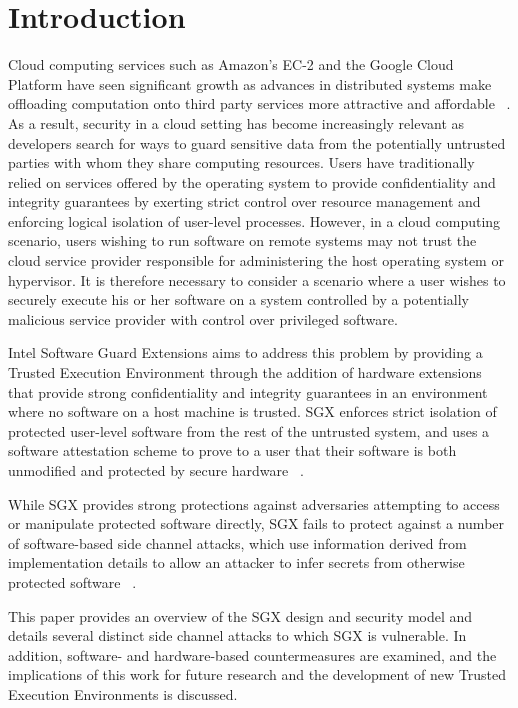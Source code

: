 \section{Introduction}

Cloud computing services such as Amazon's EC-2 and the Google Cloud Platform have seen significant growth as advances in distributed systems make offloading computation onto third party services more attractive and affordable ~\cite{lunden_amazons_2015}. As a result, security in a cloud setting has become increasingly relevant as developers search for ways to guard sensitive data from the potentially untrusted parties with whom they share computing resources. Users have traditionally relied on services offered by the operating system to provide confidentiality and integrity guarantees by exerting strict control over resource management and enforcing logical isolation of user-level processes. However, in a cloud computing scenario, users wishing to run software on remote systems may not trust the cloud service provider responsible for administering the host operating system or hypervisor. It is therefore necessary to consider a scenario where a user wishes to securely execute his or her software on a system controlled by a potentially malicious service provider with control over privileged software. 

Intel Software Guard Extensions aims to address this problem by providing a Trusted Execution Environment through the addition of hardware extensions that provide strong confidentiality and integrity guarantees in an environment where no software on a host machine is trusted. SGX enforces strict isolation of protected user-level software from the rest of the untrusted system, and uses a software attestation scheme to prove to a user that their software is both unmodified and protected by secure hardware ~\cite{intel_corporation_intel_2016}. 

While SGX provides strong protections against adversaries attempting to access or manipulate protected software directly, SGX fails to protect against a number of software-based side channel attacks, which use information derived from implementation details to allow an attacker to infer secrets from otherwise protected software ~\cite{costan_intel_2016}.

This paper provides an overview of the SGX design and security model and details several distinct side channel attacks to which SGX is vulnerable. In addition, software- and hardware-based countermeasures are examined, and the implications of this work for future research and the development of new Trusted Execution Environments is discussed.

